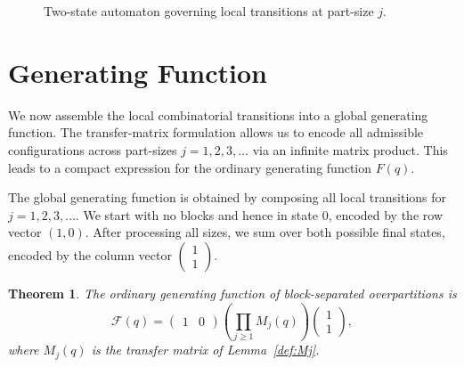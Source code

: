 \documentclass[letterpaper,12pt]{article}
\newtheorem{theorem}{Theorem}
\begin{document}
\begin{figure}[H]
\begin{tikzpicture}[x=0.75pt,y=0.75pt,yscale=-1,xscale=1]
\end{tikzpicture}    
\caption{Two-state automaton governing local transitions at part-size \(j\).}
\label{fig:automaton}
\end{figure}

\section{Generating Function}\label{sec:generating_function}
We now assemble the local combinatorial transitions into a global generating function. 
The transfer-matrix formulation allows us to encode all admissible configurations across part-sizes $j=1,2,3,\dots$ via an infinite matrix product. 
This leads to a compact expression for the ordinary generating function $F(q)$.

The global generating function is obtained by composing all local transitions
for \(j=1,2,3,\ldots\). We start with no blocks and hence in state \(0\), encoded
by the row vector \((1,0)\). After processing all sizes, we sum over both
possible final states, encoded by the column vector \( \begin{pmatrix}1\\1
\end{pmatrix}\).

\begin{theorem}\label{thm:matrix-detailed}
The ordinary generating function of block-separated overpartitions is
\begin{equation}
    \mathcal{F}(q) =
\begin{pmatrix} 1 & 0 \end{pmatrix}
\left(\prod_{j\ge1} M_j(q)\right)
\begin{pmatrix} 1 \\ 1 \end{pmatrix},
\end{equation}
where \(M_j(q)\) is the transfer matrix of Lemma~\ref{def:Mj}.
\end{theorem}
\end{document}
